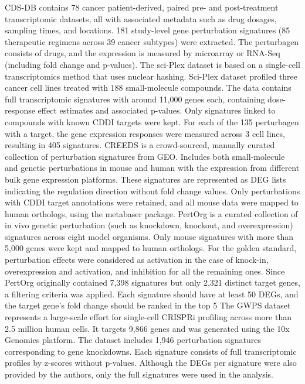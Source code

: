 CDS-DB contains 78 cancer patient-derived, paired pre- and post-treatment transcriptomic datasets, all with associated metadata such as drug dosages, sampling times, and locations. 181 study-level gene perturbation signatures (85 therapeutic regimens across 39 cancer subtypes) were extracted. The perturbagen consists of drugs, and the expression is measured by microarray or RNA-Seq (including fold change and p-values). 
The sci-Plex dataset is based on a single-cell transcriptomics method that uses nuclear hashing. Sci-Plex dataset profiled three cancer cell lines treated with 188 small-molecule compounds. The data contains full transcriptomic signatures with around 11,000 genes each, containing dose-response effect estimates and associated p-values. Only signatures linked to compounds with known CDDI targets were kept. For each of the 135 perturbagen with a target, the gene expression responses were measured across 3 cell lines, resulting in 405 signatures. 
CREEDS is a crowd-sourced, manually curated collection of perturbation signatures from GEO. Includes both small-molecule and genetic perturbations in mouse and human with the expression from different bulk gene expression platforms. These signatures are represented as DEG lists indicating the regulation direction without fold change values. Only perturbations with CDDI target annotations were retained, and all mouse data were mapped to human orthologs, using the metabaser package.
PertOrg is a curated collection of in vivo genetic perturbation (such as knockdown, knockout, and overexpression) signatures across eight model organisms. Only mouse signatures with more than 5,000 genes were kept and mapped to human orthologs. For the golden standard, perturbation effects were considered as activation in the case  of knock-in, overexpression and activation, and inhibition for all the remaining ones. Since PertOrg originally contained 7,398 signatures but only 2,321 distinct target genes, a filtering criteria was applied. Each signature should have at least 50 DEGs, and the target gene's fold change should be ranked in the top 5%
The GWPS dataset represents a large-scale effort for single-cell CRISPRi profiling across more than 2.5 million human cells. It targets 9,866 genes and was generated using the 10x Genomics platform. The dataset includes 1,946 perturbation signatures corresponding to gene knockdowns. Each signature consists of full transcriptomic profiles by z-scores without p-values. Although the DEGs per signature were also provided by the authors, only the full signatures were used in the analysis.

